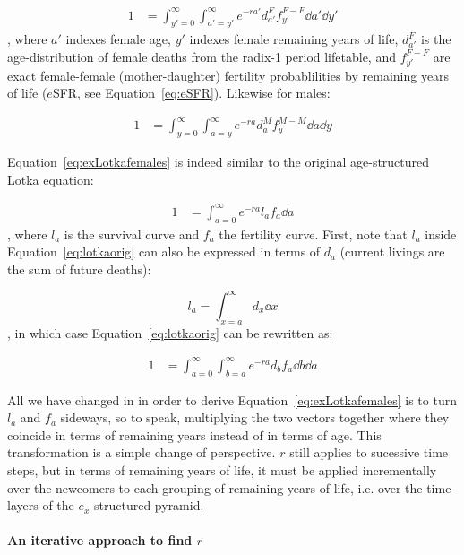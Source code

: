 \begin{align}
\label{eq:exLotkafemales}
1 &= \int _{y'=0}^\infty \int _{a'=y'}^\infty e^{-ra'} d_{a'}^F f_{y'}^{F-F} \dd
a' \dd y'
\end{align}
, where $a'$ indexes female age, $y'$ indexes female remaining years of life,
$d_{a'}^F$ is the age-distribution of female deaths from the radix-1 period
lifetable, and $f_{y'}^{F-F}$ are exact female-female (mother-daughter)
fertility probablilities by remaining years of life ($e$SFR, see Equation~\eqref{eq:eSFR}). Likewise for males:

\begin{align}
1 &= \int _{y=0}^\infty \int _{a=y}^\infty e^{-ra} d_a^M f_y^{M-M} \dd a \dd y
\end{align}

Equation~\ref{eq:exLotkafemales} is indeed similar to the
original age-structured Lotka equation:

\begin{align}
\label{eq:lotkaorig}
1 &= \int _{a=0}^\infty e^{-ra}l_a f_a \dd a
\end{align}
, where $l_a$ is the survival curve and $f_a$ the fertility curve. First, note
that $l_a$ inside Equation~\ref{eq:lotkaorig} can also be expressed in terms of
$d_a$ (current livings are the sum of future deaths):

\begin{equation}
l_a = \int _{x = a} ^\infty d_x \dd x
\end{equation}
, in which case Equation~\ref{eq:lotkaorig} can be rewritten as:

\begin{align}
\label{eq:lotkadx}
1 &= \int _{a=0}^\infty \int _{b = a}^\infty e^{-ra} d_b f_a \dd b \dd a
\end{align}

All we have changed in in order to derive Equation~\ref{eq:exLotkafemales}
is to turn $l_a$ and $f_a$ sideways, so to speak, multiplying the two vectors
together where they coincide in terms of remaining years instead of in terms of age. This
transformation is a simple change of perspective. $r$ still applies to sucessive 
time steps, but in terms of remaining years of life, it must be applied incrementally 
over the newcomers to
each grouping of remaining years of life, i.e. over the time-layers of the
$e_x$-structured pyramid.

\paragraph{An iterative approach to find $r$}

